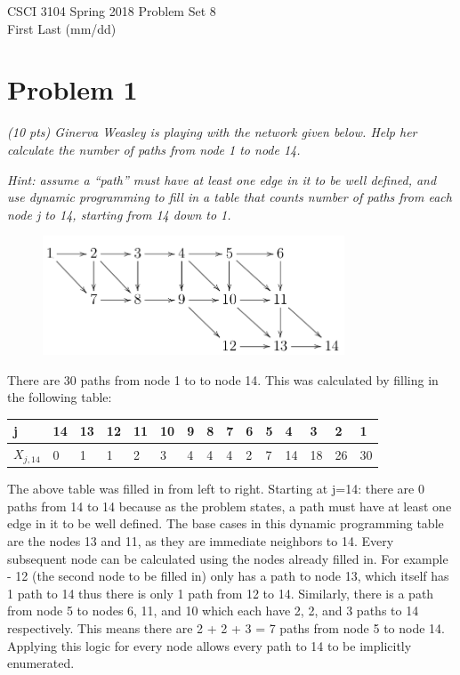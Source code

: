 \documentclass[12pt]{article} \setlength{\oddsidemargin}{0in}
\begin{document}
\noindent CSCI 3104 Spring 2018 \hfill Problem Set 8\\
First Last (mm/dd)

\graphicspath{ {images/} }

\hrulefill

{\selectfont}

\section*{Problem 1}

\textit{(10 pts) Ginerva Weasley is playing with the network given
  below. Help her calculate the number of paths from node 1 to node
  14.}

\textit{Hint: assume a ``path'' must have at least one edge in it to
  be well defined, and use dynamic programming to fill in a table that
  counts number of paths from each node j to 14, starting from 14 down
  to 1.}


\begin{figure}[h]
  \centering \includegraphics[width=0.8\textwidth]{P1}
\end{figure}

There are 30 paths from node 1 to to node 14. 
This was calculated by filling in the following table:


\begin{tabular}{ |p{1cm}||p{.5cm}|p{.5cm}|p{.5cm}|p{.5cm}|p{.5cm}|p{.5cm}|p{.5cm}|p{.5cm}|p{.5cm}|p{.5cm}|p{.5cm}|p{.5cm}|p{.5cm}|p{.5cm}| }
 \hline
  j &14&13&12&11&10&9&8&7&6&5&4&3&2&1   \\
 \hline
 \hline
  $X_{j,14}$ &0&1&1&2&3&4&4&4&2&7&14&18&26&30 \\
 \hline
\end{tabular}

The above table was filled in from left to right. Starting at j=14: there are 0 paths from 14 to 14 because as the problem states, a path must have at least one edge in it to be well defined. The base cases in this dynamic programming table are the nodes 13 and 11, as they are immediate neighbors to 14. Every subsequent node can be calculated using the nodes already filled in. For example - 12 (the second node to be filled in) only has a path to node 13, which itself has 1 path to 14 thus there is only 1 path from 12 to 14. Similarly, there is a path from node 5 to nodes 6, 11, and 10 which each have 2, 2, and 3 paths to 14 respectively. This means there are 2 + 2 + 3 = 7 paths from node 5 to node 14. Applying this logic for every node allows every path to 14 to be implicitly enumerated. 
\end{document}

